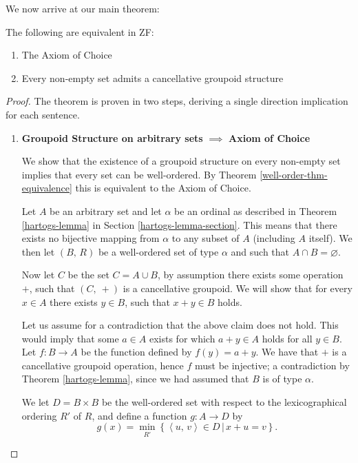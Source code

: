 \documentclass[../../main.tex]{subfiles}
\begin{document}
We now arrive at our main theorem:

\begin{theorem}\cite{Haj72}\label{main-thm}
    The following are equivalent in ZF:
    \begin{enumerate}
        \item The Axiom of Choice
        \item Every non-empty set admits a cancellative groupoid structure
    \end{enumerate}
\end{theorem}

\begin{proof}
    The theorem is proven in two steps, deriving a single direction implication for each sentence.
    \begin{enumerate}
        \item \textbf{Groupoid Structure on arbitrary sets} $\implies$ \textbf{Axiom of Choice}
        
        We show that the existence of a groupoid structure on every non-empty set implies that every set can be well-ordered.
        By Theorem \ref{well-order-thm-equivalence} this is equivalent to the Axiom of Choice.

        Let $A$ be an arbitrary set and let $\alpha$ be an ordinal as described in Theorem \ref{hartogs-lemma} in Section \ref{hartogs-lemma-section}.
        This means that there exists no bijective mapping from $\alpha$ to any subset of $A$ (including $A$ itself).
        We then let $\left(B,\, R\right)$ be a well-ordered set of type $\alpha$ and such that $A \cap B = \varnothing$.
        
        Now let $C$ be the set $C = A \cup B$, by assumption there exists some operation $+$, such that $\left(C,\ +\right)$ is a cancellative groupoid. %
        We will show that for every $x \in A$ there exists $y \in B$, such that $x + y \in B$ holds.

        Let us assume for a contradiction that the above claim does not hold.
        This would imply that some $a \in A$ exists for which $a + y \in A$ holds for all $y \in B$.
        Let $f: B \to A$ be the function defined by $f(y) = a + y$.
        We have that $+$ is a cancellative groupoid operation, hence $f$ must be injective;
        a contradiction by Theorem \ref{hartogs-lemma}, since we had assumed that $B$ is of type $\alpha$.

        We let $D = B \times B$ be the well-ordered set with respect to the lexicographical ordering $R'$ of $R$,
        and define a function $g: A \to D$ by $$g(x) = \min_{R'} \left\{\left<u,\, v\right> \in D \,\vert\, x + u = v\right\}.$$
        

\end{enumerate}
\end{proof}
\end{document}
